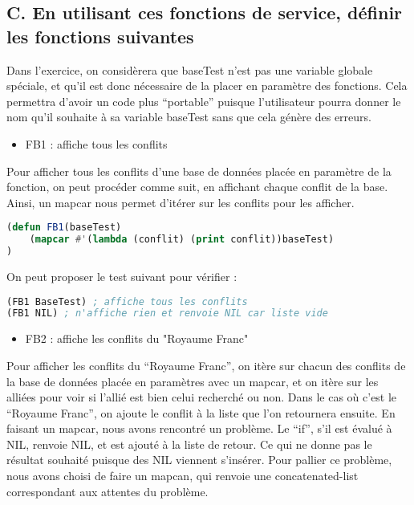 \documentclass[a4paper, 12pt]{article}
\begin{document}
\subsection{C. En utilisant ces fonctions de service, définir les fonctions suivantes}
\vspace{3mm}

Dans l’exercice, on considèrera que baseTest n’est pas une variable globale spéciale, et qu’il est donc nécessaire de la placer en paramètre des fonctions. Cela permettra d’avoir un code plus “portable” puisque l’utilisateur pourra donner le nom qu’il souhaite à sa variable baseTest sans que cela génère des erreurs.
\vspace{5mm}

\begin{itemize}[label=\textbullet]
\item FB1 : affiche tous les conflits
\end{itemize}
\vspace{3mm}

Pour afficher tous les conflits d’une base de données placée en paramètre de la fonction, on peut procéder comme suit, en affichant chaque conflit de la base. Ainsi, un mapcar nous permet d'itérer sur les conflits pour les afficher.
\vspace{2mm}

\begin{lstlisting}[language=Lisp]
(defun FB1(baseTest)
    (mapcar #'(lambda (conflit) (print conflit))baseTest)
)
\end{lstlisting}
\vspace{2mm}

On peut proposer le test suivant pour vérifier :
\vspace{2mm}

\begin{lstlisting}[language=Lisp]
(FB1 BaseTest) ; affiche tous les conflits
(FB1 NIL) ; n'affiche rien et renvoie NIL car liste vide
\end{lstlisting}
\vspace{5mm}

\begin{itemize}[label=\textbullet]
\item FB2 : affiche les conflits du "Royaume Franc"
\end{itemize}
\vspace{3mm}

Pour afficher les conflits du “Royaume Franc”, on itère sur chacun des conflits de la base de données placée en paramètres avec un mapcar, et on itère sur les alliées pour voir si l’allié est bien celui recherché ou non. Dans le cas où c’est le “Royaume Franc”, on ajoute le conflit à la liste que l’on retournera ensuite. En faisant un mapcar, nous avons rencontré un problème. Le “if”, s’il est évalué à NIL, renvoie NIL, et est ajouté à la liste de retour. Ce qui ne donne pas le résultat souhaité puisque des NIL viennent s’insérer. Pour pallier ce problème, nous avons choisi de faire un mapcan, qui renvoie une concatenated-list correspondant aux attentes du problème.
\vspace{2mm}
\end{document}
